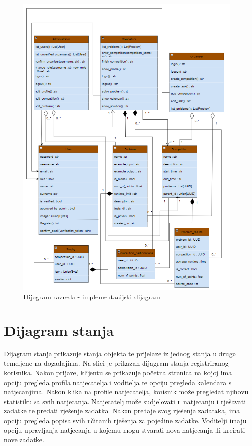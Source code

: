 			\begin{figure}[H]
				\includegraphics[width=\linewidth]{slike/ImplementacijskiDijagramRazreda}
				\centering
				\caption{Dijagram razreda - implementacijski dijagram}
				\label{fig:implementacija4}
			\end{figure}
			
			\eject
		
		\section{Dijagram stanja}

			Dijagram stanja prikazuje stanja objekta te prijelaze iz jednog stanja u drugo temeljene na događajima.
			Na slici je prikazan dijagram stanja registriranog korisnika.
			Nakon prijave, klijentu se prikazuje početna stranica na kojoj ima opciju pregleda profila natjecatelja i voditelja te opciju pregleda kalendara s natjecanjima. Nakon klika na profile natjecatelja, korisnik može pregledat njihovu statistiku sa svih natjecanja. 
			Natjecatelj može sudjelovati u natjecanju i rješavati zadatke te predati rješenje zadatka. Nakon predaje svog rješenja zadataka, ima opciju pregleda popisa svih učitanih rješenja za pojedine zadatke.
			Voditelji imaju opciju upravljanja natjecanja u kojemu mogu stvarati nova natjecanja ili kreirati nove zadatke.
			
